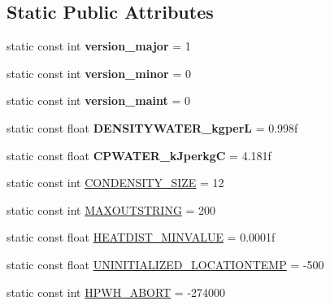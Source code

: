 \subsection*{Static Public Attributes}
\begin{DoxyCompactItemize}
\item 
\hypertarget{class_h_p_w_h_a404694da361f91cab76c434bc2e8aba7}{static const int {\bfseries version\-\_\-major} = 1}\label{class_h_p_w_h_a404694da361f91cab76c434bc2e8aba7}

\item 
\hypertarget{class_h_p_w_h_a4d21de98801ba96190a10fce9f7e0007}{static const int {\bfseries version\-\_\-minor} = 0}\label{class_h_p_w_h_a4d21de98801ba96190a10fce9f7e0007}

\item 
\hypertarget{class_h_p_w_h_af02ab978efb608dbcb3010f51fec5bee}{static const int {\bfseries version\-\_\-maint} = 0}\label{class_h_p_w_h_af02ab978efb608dbcb3010f51fec5bee}

\item 
\hypertarget{class_h_p_w_h_ad731cfda8428fb584d308f98c2eb329a}{static const float {\bfseries D\-E\-N\-S\-I\-T\-Y\-W\-A\-T\-E\-R\-\_\-kgper\-L} = 0.\-998f}\label{class_h_p_w_h_ad731cfda8428fb584d308f98c2eb329a}

\item 
\hypertarget{class_h_p_w_h_abf1c9972b0dc6bfe5ec90042d03db7f4}{static const float {\bfseries C\-P\-W\-A\-T\-E\-R\-\_\-k\-Jperkg\-C} = 4.\-181f}\label{class_h_p_w_h_abf1c9972b0dc6bfe5ec90042d03db7f4}

\item 
static const int \hyperlink{class_h_p_w_h_a545073febf9422e346d62d27093b8eb8}{C\-O\-N\-D\-E\-N\-S\-I\-T\-Y\-\_\-\-S\-I\-Z\-E} = 12
\item 
static const int \hyperlink{class_h_p_w_h_aee834cec1de7483ecf642d310a7da75f}{M\-A\-X\-O\-U\-T\-S\-T\-R\-I\-N\-G} = 200
\item 
static const float \hyperlink{class_h_p_w_h_a17bd9d54d4aa54393078e4be104675dd}{H\-E\-A\-T\-D\-I\-S\-T\-\_\-\-M\-I\-N\-V\-A\-L\-U\-E} = 0.\-0001f
\item 
static const float \hyperlink{class_h_p_w_h_aaa8fb3333f8cb5caf7ef0c92d3d8f998}{U\-N\-I\-N\-I\-T\-I\-A\-L\-I\-Z\-E\-D\-\_\-\-L\-O\-C\-A\-T\-I\-O\-N\-T\-E\-M\-P} = -\/500
\item 
static const int \hyperlink{class_h_p_w_h_a727a9e272cf7ac3564ebd67bfb8ed063}{H\-P\-W\-H\-\_\-\-A\-B\-O\-R\-T} = -\/274000
\end{DoxyCompactItemize}



